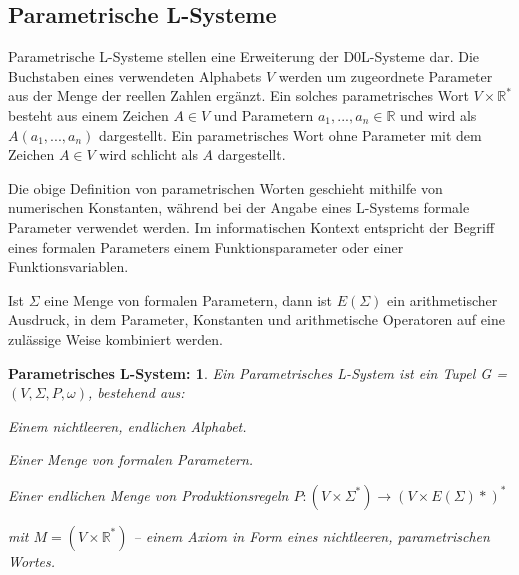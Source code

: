 \subsection{Parametrische L-Systeme}

Parametrische L-Systeme stellen eine Erweiterung der D0L-Systeme dar. Die Buchstaben eines verwendeten Alphabets $V$ werden um zugeordnete Parameter aus der Menge der reellen Zahlen ergänzt. Ein solches parametrisches Wort $V \times \mathbb{R}^*$ besteht aus einem Zeichen $A \in V$ und Parametern $a_1,...,a_n \in \mathbb{R}$ und wird als $A(a_1,...,a_n)$ dargestellt. Ein parametrisches Wort ohne Parameter mit dem Zeichen $A \in V$  wird schlicht als $A$ dargestellt. \cite[S.41]{ABOP:04}

Die obige Definition von parametrischen Worten geschieht mithilfe von numerischen Konstanten, während bei der Angabe eines L-Systems formale Parameter verwendet werden. Im informatischen Kontext entspricht der Begriff eines formalen Parameters einem Funktionsparameter oder einer Funktionsvariablen. \cite[S.16f]{FormalParamDef:05} 

Ist $\Sigma$ eine Menge von formalen Parametern, dann ist $E(\Sigma)$ ein arithmetischer Ausdruck, in dem Parameter, Konstanten und arithmetische Operatoren auf eine zulässige Weise kombiniert werden. \cite[S.41]{ABOP:04}

\newtheorem{defParametrischeLSysteme}{Parametrisches L-System:}[section]
\begin{defParametrischeLSysteme}
	Ein Parametrisches L-System ist ein Tupel G = $(V, \Sigma, P, \omega)$, bestehend aus:
	\begin{description}[labelindent]
		\item[\boldmath$V$] Einem nichtleeren, endlichen Alphabet.\\
		
		\item[\boldmath$\Sigma$] Einer Menge von formalen Parametern.\\
		
		\item[\boldmath$P$] Einer endlichen Menge von Produktionsregeln $P : (V\times \Sigma^*) \rightarrow (V\times E(\Sigma)*)^*$\\
		
		\item[\boldmath$\omega \in M^+$] mit $M =(V \times \mathbb{R}^*)$ -- einem Axiom in Form eines nichtleeren, parametrischen Wortes.
	\end{description}
\cite[S.41]{ABOP:04}
\end{defParametrischeLSysteme}

